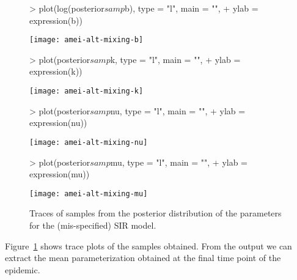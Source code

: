 \documentclass[shortnames,nojss]{jss}
\begin{document}
\begin{figure}[ht!]
 \centering
\begin{Schunk}
\begin{Sinput}
> plot(log(posterior$samp$b), type = "l", main = "", 
+     ylab = expression(b))
\end{Sinput}
\end{Schunk}
\texttt{[image: amei-alt-mixing-b]}
\begin{Schunk}
\begin{Sinput}
> plot(posterior$samp$k, type = "l", main = "", 
+     ylab = expression(k))
\end{Sinput}
\end{Schunk}
\texttt{[image: amei-alt-mixing-k]}
\begin{Schunk}
\begin{Sinput}
> plot(posterior$samp$nu, type = "l", main = "", 
+     ylab = expression(nu))
\end{Sinput}
\end{Schunk}
\texttt{[image: amei-alt-mixing-nu]}
\begin{Schunk}
\begin{Sinput}
> plot(posterior$samp$mu, type = "l", main = "", 
+     ylab = expression(mu))
\end{Sinput}
\end{Schunk}
\texttt{[image: amei-alt-mixing-mu]}
\caption{Traces of samples from the posterior distribution of the parameters
  for the (mis-specified) SIR model.}
\label{f:alt-mixing}
\end{figure}
Figure~\ref{f:alt-mixing} shows trace plots of the samples obtained.
From the output we can extract the mean parameterization obtained
at the final time point of the epidemic.
\begin{Schunk}
\end{Schunk}
\end{document}
